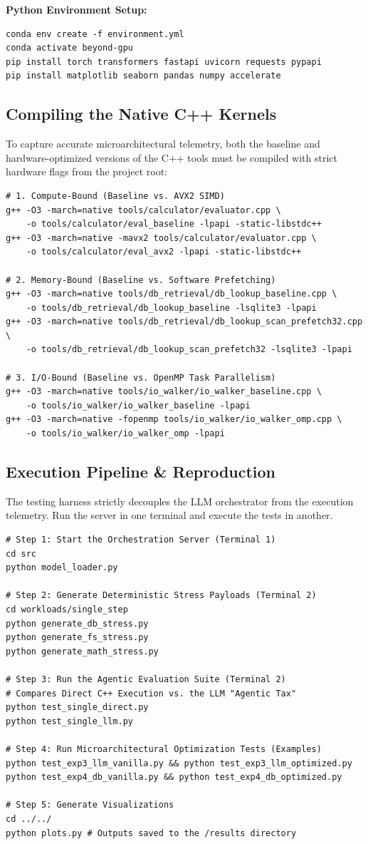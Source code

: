 \documentclass[10pt, letterpaper]{article}
\begin{document}
\noindent \textbf{Python Environment Setup:}
\begin{verbatim}
conda env create -f environment.yml
conda activate beyond-gpu
pip install torch transformers fastapi uvicorn requests pypapi 
pip install matplotlib seaborn pandas numpy accelerate
\end{verbatim}

\subsection{Compiling the Native C++ Kernels}
To capture accurate microarchitectural telemetry, both the baseline and hardware-optimized versions of the C++ tools must be compiled with strict hardware flags from the project root:

\begin{verbatim}
# 1. Compute-Bound (Baseline vs. AVX2 SIMD)
g++ -O3 -march=native tools/calculator/evaluator.cpp \
    -o tools/calculator/eval_baseline -lpapi -static-libstdc++
g++ -O3 -march=native -mavx2 tools/calculator/evaluator.cpp \
    -o tools/calculator/eval_avx2 -lpapi -static-libstdc++

# 2. Memory-Bound (Baseline vs. Software Prefetching)
g++ -O3 -march=native tools/db_retrieval/db_lookup_baseline.cpp \
    -o tools/db_retrieval/db_lookup_baseline -lsqlite3 -lpapi 
g++ -O3 -march=native tools/db_retrieval/db_lookup_scan_prefetch32.cpp \
    -o tools/db_retrieval/db_lookup_scan_prefetch32 -lsqlite3 -lpapi

# 3. I/O-Bound (Baseline vs. OpenMP Task Parallelism)
g++ -O3 -march=native tools/io_walker/io_walker_baseline.cpp \
    -o tools/io_walker/io_walker_baseline -lpapi
g++ -O3 -march=native -fopenmp tools/io_walker/io_walker_omp.cpp \
    -o tools/io_walker/io_walker_omp -lpapi
\end{verbatim}

\subsection{Execution Pipeline \& Reproduction}
The testing harness strictly decouples the LLM orchestrator from the execution telemetry. Run the server in one terminal and execute the tests in another.

\begin{verbatim}
# Step 1: Start the Orchestration Server (Terminal 1)
cd src
python model_loader.py

# Step 2: Generate Deterministic Stress Payloads (Terminal 2)
cd workloads/single_step
python generate_db_stress.py
python generate_fs_stress.py
python generate_math_stress.py

# Step 3: Run the Agentic Evaluation Suite (Terminal 2)
# Compares Direct C++ Execution vs. the LLM "Agentic Tax"
python test_single_direct.py
python test_single_llm.py

# Step 4: Run Microarchitectural Optimization Tests (Examples)
python test_exp3_llm_vanilla.py && python test_exp3_llm_optimized.py
python test_exp4_db_vanilla.py && python test_exp4_db_optimized.py

# Step 5: Generate Visualizations
cd ../../
python plots.py # Outputs saved to the /results directory
\end{verbatim}
\end{document}
